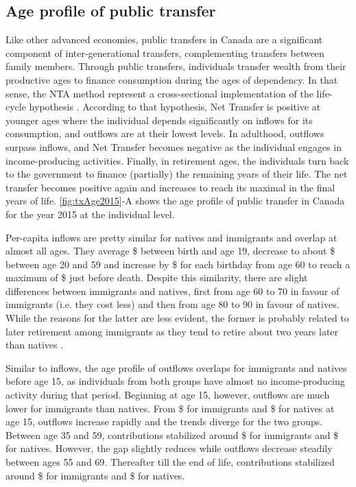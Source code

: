 \subsection{Age profile of public transfer}
Like other advanced economies, public transfers in Canada are a significant component of inter-generational transfers, complementing transfers between family members.
Through public transfers, individuals transfer wealth from their productive ages to finance consumption during the ages of dependency.
In that sense, the NTA method represent a cross-sectional implementation of the life-cycle hypothesis \citep{Ando:1963ea,Deaton:2005vr}.
According to that hypothesis, Net Transfer is positive at younger ages where the individual depends significantly on inflows for its consumption, and outflows are at their lowest levels.
In adulthood, outflows surpass inflows, and Net Transfer becomes negative as the individual engages in income-producing activities.
Finally, in retirement ages, the individuals turn back to the government to finance (partially) the remaining years of their life.
The net transfer becomes positive again and increases to reach its maximal in the final years of life. \autoref{fig:txAge2015}-A shows the age profile of public transfer in Canada for the year 2015 at the individual level.

\vspace{0.7em}\par
Per-capita inflows are pretty similar for natives and immigrants and overlap at almost all ages.
They average \$ between birth and age 19, decrease to about \$ between age 20 and 59 and increase by \$ for each birthday from age 60 to reach a maximum of \$ just before death.
Despite this similarity, there are slight differences between immigrants and natives, first from age 60 to 70 in favour of immigrants (i.e. they cost less) and then from age 80 to 90 in favour of natives.
While the reasons for the latter are less evident, the former is probably related to later retirement among immigrants as they tend to retire about two years later than natives \citep[p~284]{statCan:006}.

\vspace{0.7em}\par
Similar to inflows, the age profile of outflows overlaps for immigrants and natives before age 15, as individuals from both groups have almost no income-producing activity during that period.
Beginning at age 15, however, outflows are much lower for immigrants than natives.
From \$ for immigrants and \$ for natives at age 15, outflows increase rapidly and the trends diverge for the two groups.
Between age 35 and 59, contributions stabilized around \$ for immigrants and \$ for natives.
However, the gap slightly reduces while outflows decrease steadily between ages 55 and 69.
Thereafter till the end of life, contributions stabilized around \$ for immigrants and \$ for natives.

